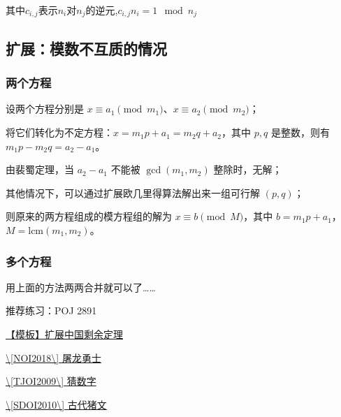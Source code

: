 其中$c_{i,j}$表示$n_i$对$n_j$的逆元,$c_{i,j}n_i=1 \mod n_j$

\subsection{扩展：模数不互质的情况}

\subsubsection{两个方程}

设两个方程分别是 $x\equiv a_1 \pmod {m_1}$、$x\equiv a_2 \pmod {m_2}$；

将它们转化为不定方程：$x=m_1p+a_1=m_2q+a_2$，其中 $p, q$ 是整数，则有 $m_1p-m_2q=a_2-a_1$。

由裴蜀定理，当 $a_2-a_1$ 不能被 $\gcd(m_1,m_2)$ 整除时，无解；

其他情况下，可以通过扩展欧几里得算法解出来一组可行解 $(p, q)$；

则原来的两方程组成的模方程组的解为 $x\equiv b\pmod M$，其中 $b=m_1p+a_1$，$M=\text{lcm}(m_1, m_2)$。

\subsubsection{多个方程}

用上面的方法两两合并就可以了……

推荐练习：POJ 2891

\href{https://www.luogu.org/problemnew/show/P4777}{【模板】扩展中国剩余定理}

\href{https://www.luogu.org/problemnew/show/P4774}{\textbackslash{}[NOI2018\textbackslash{}] 屠龙勇士}

\href{https://www.luogu.org/problemnew/show/P3868}{\textbackslash{}[TJOI2009\textbackslash{}] 猜数字}

\href{https://www.luogu.org/problemnew/show/P2480}{\textbackslash{}[SDOI2010\textbackslash{}] 古代猪文}
